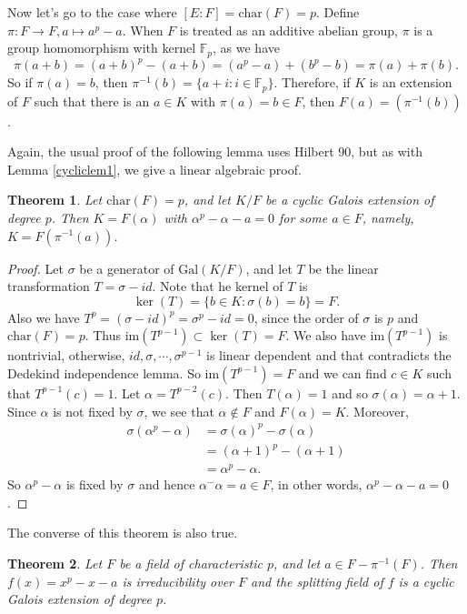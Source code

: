 \documentclass[12pt]{report}
\newtheorem{thm}{Theorem}[section]
\theoremstyle{definition}
\def\FF{\mathbb{F}}
\def\im{\text{im}}
\def\aa{\alpha}
\def\Gal{\text{Gal}}
\def\char{\text{char}}
\begin{document}
Now let's go to the case where $[E:F]=\char(F)=p$. Define $\pi: F\to F, a\mapsto a^p-a$. When $F$ is treated as an additive abelian group, $\pi$ is a group homomorphism with kernel $\FF_p$, as we have $$\pi(a+b)=(a+b)^p-(a+b)=(a^p-a)+(b^p-b)=\pi(a)+\pi(b).$$
So if $\pi(a)=b$, then $\pi^{-1}(b)=\{a+i: i\in \FF_p\}$. Therefore, if $K$ is an extension of $F$ such that there is an $a\in K$ with $\pi(a)=b\in F$, then $F(a)=(\pi^{-1}(b))$.

Again, the usual proof of the following lemma uses Hilbert 90, but as with Lemma \ref{cycliclem1}, we give a linear algebraic proof.

\begin{thm}
    Let $\char(F)=p$, and let $K/F$ be a cyclic Galois extension of degree $p$. Then $K=F(\aa)$ with $\aa^p-\aa-a=0$ for some $a\in F$, namely, $K=F(\pi^{-1}(a))$.
\end{thm}

\begin{proof}
    Let $\sigma$ be a generator of $\Gal(K/F)$, and let $T$ be the linear transformation $T=\sigma-id$. Note that he kernel of $T$ is $$\ker(T)=\{b\in K: \sigma(b)=b\}=F.$$ Also we have $T^p=(\sigma-id)^p=\sigma^p-id=0$, since the order of $\sigma$ is $p$ and $\char(F)=p$. Thus $\im(T^{p-1})\subset \ker(T)=F$. We also have $\im(T^{p-1})$ is nontrivial, otherwise, $id,\sigma,\cdots,\sigma^{p-1}$ is linear dependent and that contradicts the Dedekind independence lemma. So $\im(T^{p-1})=F$ and we can find $c\in K$ such that $T^{p-1}(c)=1$. Let $\aa=T^{p-2}(c)$. Then $T(\aa)=1$ and so $\sigma(\aa)=\aa+1$. Since $\aa$ is not fixed by $\sigma$, we see that $\aa\notin F$ and $F(\aa)=K$. Moreover, \begin{align*}
        \sigma(\aa^p -\aa)&=\sigma(\aa)^p-\sigma(\aa) \\
        &= (\aa+1)^p-(\aa+1)\\
        &=\aa^p-\aa.
    \end{align*}
    So $\aa^p-\aa$ is fixed by $\sigma$ and hence $\aa^-\aa=a\in F$, in other words, $\aa^p-\aa-a=0$.
\end{proof}

The converse of this theorem is also true.

\begin{thm}
    Let $F$ be a field of characteristic $p$, and let $a\in F-\pi^{-1}(F)$. Then $f(x)=x^p-x-a$ is irreducibility over $F$ and the splitting field of $f$ is a cyclic Galois extension of degree $p$.
\end{thm}
\end{document}
